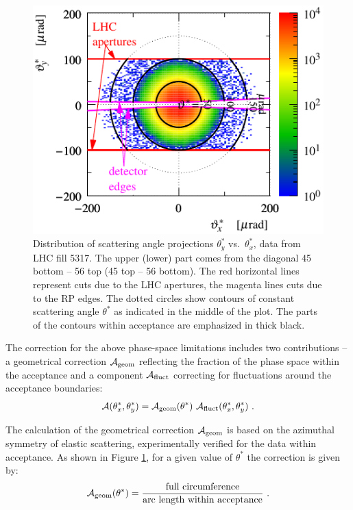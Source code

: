 \begin{figure}
\begin{center}
\includegraphics{fig/acc_phi_lab.pdf}
\caption{%
Distribution of scattering angle projections $\theta_y^*$ vs.~$\theta_x^*$, data from LHC fill 5317. The upper (lower) part comes from the diagonal 45 bottom -- 56 top (45 top -- 56 bottom). The red horizontal lines represent cuts due to the LHC apertures, the magenta lines cuts due to the RP edges. The dotted circles show contours of constant scattering angle $\theta^*$ as indicated in the middle of the plot. The parts of the contours within acceptance are emphasized in thick black.
}
\label{fig:acc corr princ}
\end{center}
\end{figure}

The correction for the above phase-space limitations includes two contributions -- a geometrical correction $\mathcal{A}_{\rm geom}$ reflecting the fraction of the phase space within the acceptance and a component $\mathcal{A}_{\rm fluct}$ correcting for fluctuations around the acceptance boundaries:
\begin{equation}
\mathcal{A}(\theta^*_x, \theta_y^*) = \mathcal{A}_{\rm geom}(\theta^*)\ \mathcal{A}_{\rm fluct}(\theta^*_x, \theta_y^*)\ .
\end{equation}

The calculation of the geometrical correction $\mathcal{A}_{\rm geom}$ is based on the azimuthal symmetry of elastic scattering, experimentally verified for the data within acceptance. As shown in Figure \ref{fig:acc corr princ}, for a given value of $\theta^*$ the correction is given by:
\begin{equation}
\label{eq:acc geom}
\mathcal{A_{\rm geom}}(\theta^*) = {
	\hbox{full circumference}\over 
	\hbox{arc length within acceptance}
} \ .
\end{equation}

